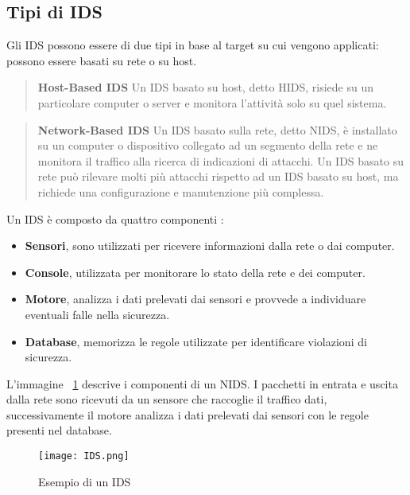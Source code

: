 \documentclass[../main.tex]{subfiles}
\begin{document}
\subsection{Tipi di IDS}
Gli IDS possono essere di due tipi in base al target su cui vengono applicati: possono essere basati su rete o su host.
\begin{verse}
				\textbf{Host-Based IDS} Un IDS basato su host, detto HIDS, risiede su un particolare computer o server e monitora l'attività solo su quel sistema.
\end{verse}

\begin{verse}
				\textbf{Network-Based IDS} Un IDS basato sulla rete, detto NIDS, è installato su un computer o dispositivo collegato ad un segmento della rete e ne monitora il traffico alla ricerca di indicazioni di attacchi. Un IDS basato su rete può rilevare molti più attacchi rispetto ad un IDS basato su host, ma richiede una configurazione e manutenzione più complessa.
\end{verse}

Un IDS è composto da quattro componenti \cite{idsbook}:

\begin{itemize}
				\item \textbf{Sensori}, sono utilizzati per ricevere informazioni dalla rete o dai computer.

				\item \textbf{Console}, utilizzata per monitorare lo stato della rete e dei computer.

				\item \textbf{Motore}, analizza i dati prelevati dai sensori e provvede a individuare eventuali falle nella sicurezza.

				\item \textbf{Database}, memorizza le regole utilizzate per identificare violazioni di sicurezza.
\end{itemize}

L'immagine ~\ref{fig:esempioIds} descrive i componenti di un NIDS. I pacchetti in entrata e uscita dalla rete sono ricevuti da un sensore che raccoglie il traffico dati, successivamente il motore analizza i dati prelevati dai sensori con le regole presenti nel database.

\begin{figure}[H]
				\centering
				\texttt{[image: IDS.png]}
				\caption{Esempio di un IDS}
				\label{fig:esempioIds}
\end{figure}
\end{document}
